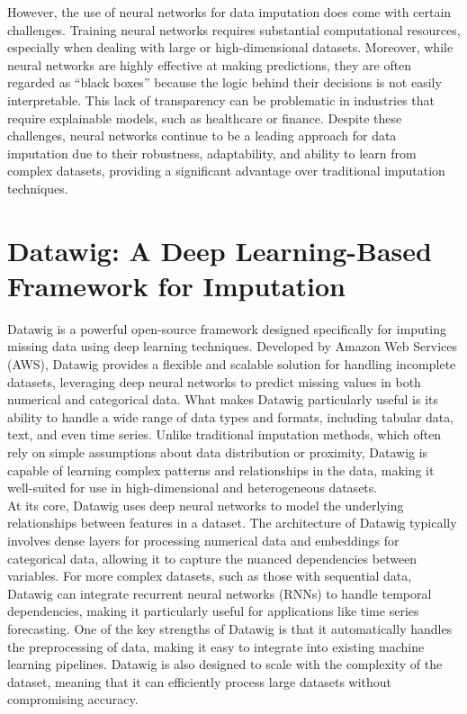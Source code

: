 \documentclass{article}
\begin{document}
However, the use of neural networks for data imputation does come with certain challenges. Training neural networks requires substantial computational resources, especially when dealing with large or high-dimensional datasets. Moreover, while neural networks are highly effective at making predictions, they are often regarded as “black boxes” because the logic behind their decisions is not easily interpretable. This lack of transparency can be problematic in industries that require explainable models, such as healthcare or finance. Despite these challenges, neural networks continue to be a leading approach for data imputation due to their robustness, adaptability, and ability to learn from complex datasets, providing a significant advantage over traditional imputation techniques.
\pagebreak
\section{Datawig: A Deep Learning-Based Framework for Imputation}
Datawig is a powerful open-source framework designed specifically for imputing missing data using deep learning techniques. Developed by Amazon Web Services (AWS), Datawig provides a flexible and scalable solution for handling incomplete datasets, leveraging deep neural networks to predict missing values in both numerical and categorical data. What makes Datawig particularly useful is its ability to handle a wide range of data types and formats, including tabular data, text, and even time series. Unlike traditional imputation methods, which often rely on simple assumptions about data distribution or proximity, Datawig is capable of learning complex patterns and relationships in the data, making it well-suited for use in high-dimensional and heterogeneous datasets.
\\
At its core, Datawig uses deep neural networks to model the underlying relationships between features in a dataset. The architecture of Datawig typically involves dense layers for processing numerical data and embeddings for categorical data, allowing it to capture the nuanced dependencies between variables. For more complex datasets, such as those with sequential data, Datawig can integrate recurrent neural networks (RNNs) to handle temporal dependencies, making it particularly useful for applications like time series forecasting. One of the key strengths of Datawig is that it automatically handles the preprocessing of data, making it easy to integrate into existing machine learning pipelines. Datawig is also designed to scale with the complexity of the dataset, meaning that it can efficiently process large datasets without compromising accuracy.
\end{document}
